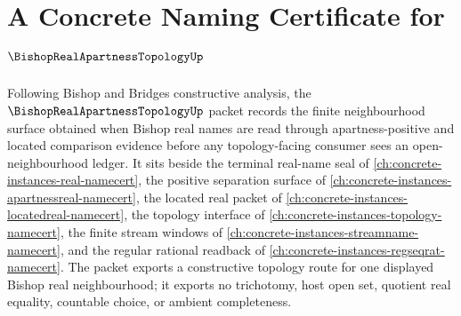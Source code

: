 \chapter{A Concrete Naming Certificate for $\BishopRealApartnessTopologyUp$}
\label{ch:concrete-instances-bishop-real-apartness-topology-namecert}

Following Bishop and Bridges constructive analysis, the $\BishopRealApartnessTopologyUp$ packet records the finite neighbourhood surface obtained when Bishop real names are read through apartness-positive and located comparison evidence before any topology-facing consumer sees an open-neighbourhood ledger. It sits beside the terminal real-name seal of \autoref{ch:concrete-instances-real-namecert}, the positive separation surface of \autoref{ch:concrete-instances-apartnessreal-namecert}, the located real packet of \autoref{ch:concrete-instances-locatedreal-namecert}, the topology interface of \autoref{ch:concrete-instances-topology-namecert}, the finite stream windows of \autoref{ch:concrete-instances-streamname-namecert}, and the regular rational readback of \autoref{ch:concrete-instances-regseqrat-namecert}. The packet exports a constructive topology route for one displayed Bishop real neighbourhood; it exports no trichotomy, host open set, quotient real equality, countable choice, or ambient completeness.

